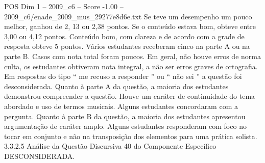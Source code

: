 \begin{textsample}{POS Dim 1 – 2009\_c6 – Score -1.00 – 2009\_c6/enade\_2009\_mus\_29277e8d6e.txt}
Se teve um desempenho um pouco melhor, ganhou de 2, 13 ou 2,38 pontos.
Se o conteúdo estava bom, obteve entre 3,00 ou 4,12 pontos.
Conteúdo bom, com clareza e de acordo com a grade de resposta obteve 5 pontos.
Vários estudantes receberam cinco na parte A ou na parte B.
Casos com nota total foram poucos.
Em geral, não houve erros de norma culta, os estudantes obtiveram nota integral, a não ser erros graves de ortografia.
Em respostas do tipo “ me recuso a responder ” ou “ não sei ” a questão foi desconsiderada.
Quanto à parte A da questão, a maioria dos estudantes demonstrou compreender a questão.
Houve um caráter de continuidade do tema abordado e uso de termos musicais.
Alguns estudantes concordaram com a pergunta.
Quanto à parte B da questão, a maioria dos estudantes apresentou argumentação de caráter amplo.
Alguns estudantes responderam com foco no tocar em conjunto e não na transposição dos elementos para uma prática solista. 3.3.2.5 Análise da Questão Discursiva 40 do Componente Específico DESCONSIDERADA.

\end{textsample}
